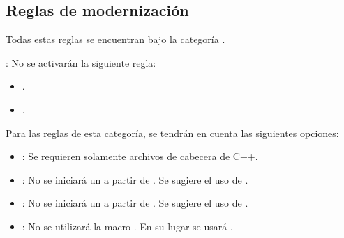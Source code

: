 \subsection{Reglas de modernización}

Todas estas reglas se encuentran bajo la categoría .

: No se activarán la siguiente regla:
\begin{itemize}

\item {}.
\item {}.

\end{itemize}

Para las reglas de esta categoría, se tendrán en cuenta las siguientes
opciones:

\begin{itemize}

\item {}:
Se requieren solamente archivos de cabecera de C++.

\item {}:
No se iniciará un  a partir de .
Se sugiere el uso de .

\item {}:
No se iniciará un  a partir de .
Se sugiere el uso de .

\item {}:
No se utilizará la macro .
En su lugar se usará .


\end{itemize}
